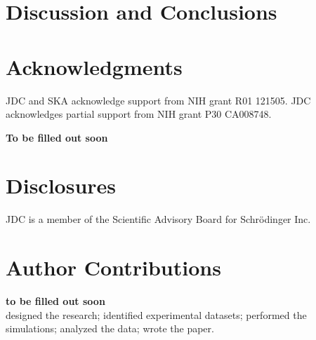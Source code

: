\documentclass[9pt,lineno]{elife-modified} %
\begin{document}
%
%
%
%
\section{Discussion and Conclusions}
	
%
\newpage
%




\section{Acknowledgments}
JDC and SKA acknowledge support from NIH grant R01 121505.
JDC acknowledges partial support from NIH grant P30 CA008748.

\textbf{To be filled out soon}


\section{Disclosures}

JDC is a member of the Scientific Advisory Board for Schr\"{o}dinger Inc.


\section{Author Contributions}
\textbf{to be filled out soon} \\
 designed the research; 
 identified experimental datasets; 
 performed the simulations; 
 analyzed the data; 
 wrote the paper.

%
\newpage
%






%
%
%



%
%
\newpage
%
%





%
%
%
%
%
%





\end{document}
